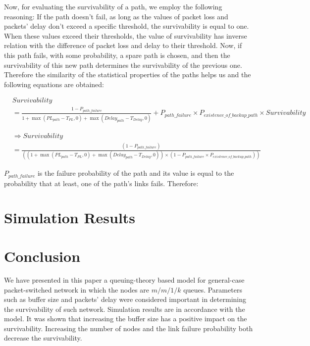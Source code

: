 \documentclass[onecolumn,conference]{IEEEtran}
\begin{document}
    Now, for evaluating the survivability of a path, we employ the following reasoning:
    If the path doesn't fail, as long as the values of packet loss and packets' delay don't exceed a specific threshold, the survivability is equal to one. When these values exceed their thresholds, the value of survivability has inverse relation with the difference of packet loss and delay to their threshold. Now, if this path fails, with some probability, a spare path is chosen, and then the survivability of this new path determines the survivability of the previous one. Therefore the similarity of the statistical properties of the paths helps us and the following equations are obtained:

    \begin{equation}
        \begin{split}
            &Survivability\\&=\frac{1-P_{path\_failure}}{1+\max\left(PL_{path}-T_{PL},0\right)+\max\left(Delay_{path}-T_{Delay},0\right)}+P_{path\_failure}\times P_{existence\_of\_backup\_path}\times
            Survivability
        \end{split}
    \end{equation}

    \begin{equation}
        \begin{split}
            &\Rightarrow Survivability
            \\&=\frac{\left( 1-P_{path\_failure} \right)}
            {\left(
            \left(1+\max\left(PL_{path}-T_{PL},0\right)+\max\left(Delay_{path}-T_{Delay},0 \right)\right)
            \times
            \left(1- P_{path\_failure}\times P_{existence\_of\_backup\_path} \right)
            \right)}
        \end{split}
    \end{equation}

    $P_{path\_failure}$ is the failure probability of the path and its value is equal to the probability that at least, one of the path's links fails. Therefore:

    \section{Simulation Results} \label{sec:simres}

    \section{Conclusion} \label{sec:conc}
    We have presented in this paper a queuing-theory based model for general-case packet-switched network in which the nodes are $m/m/1/k$ queues. Parameters such as buffer size and packets' delay were considered important in determining the survivability of such network. Simulation results are in accordance with the model. It was shown that increasing the buffer size has a positive impact on the survivability. Increasing the number of nodes and the link failure probability both decrease the survivability.
\end{document}
